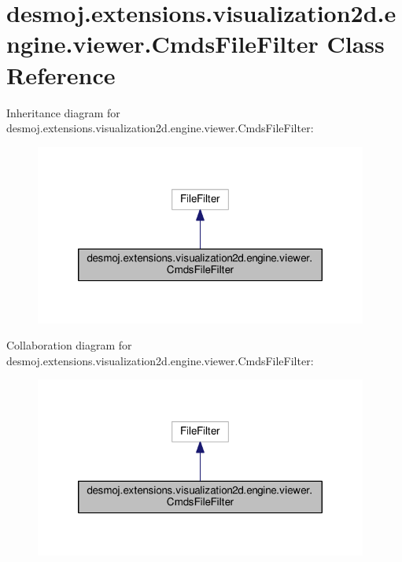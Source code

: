 \section{desmoj.\-extensions.\-visualization2d.\-engine.\-viewer.\-Cmds\-File\-Filter Class Reference}
\label{classdesmoj_1_1extensions_1_1visualization2d_1_1engine_1_1viewer_1_1_cmds_file_filter}


Inheritance diagram for desmoj.\-extensions.\-visualization2d.\-engine.\-viewer.\-Cmds\-File\-Filter\-:
\nopagebreak
\begin{figure}[H]
\begin{center}
\leavevmode
\includegraphics[width=310pt]{classdesmoj_1_1extensions_1_1visualization2d_1_1engine_1_1viewer_1_1_cmds_file_filter__inherit__graph}
\end{center}
\end{figure}


Collaboration diagram for desmoj.\-extensions.\-visualization2d.\-engine.\-viewer.\-Cmds\-File\-Filter\-:
\nopagebreak
\begin{figure}[H]
\begin{center}
\leavevmode
\includegraphics[width=310pt]{classdesmoj_1_1extensions_1_1visualization2d_1_1engine_1_1viewer_1_1_cmds_file_filter__coll__graph}
\end{center}
\end{figure}
